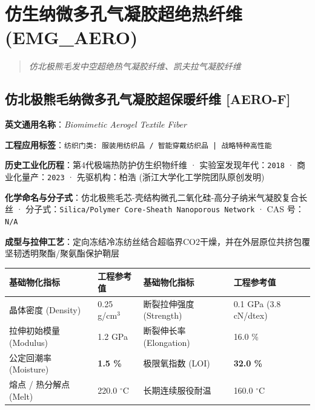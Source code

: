 \documentclass[11pt,openright,twoside,UTF8]{ctexbook}
\begin{document}
\chapter{仿生纳微多孔气凝胶超绝热纤维 (EMG\_AERO)}
\begin{quote}
\small\itshape
仿北极熊毛发中空超绝热气凝胶纤维、凯夫拉气凝胶纤维
\end{quote}

\section{仿北极熊毛纳微多孔气凝胶超保暖纤维 [AERO-F]}
\label{sec:aero-f}

\noindent\textbf{英文通用名称}：\textit{Biomimetic Aerogel Textile Fiber}\par
\noindent\textbf{工程应用标签}：\texttt{纺织门类: 服装用纺织品 / 智能穿戴纺织品 | 战略特种高性能}\par
\noindent\textbf{历史工业化历程}：第4代极端热防护仿生织物纤维 · 实验室发现年代：\texttt{2018} · 商业化量产：\texttt{2023} · 先驱机构：柏浩 (浙江大学化工学院团队原创发明)\par
\noindent\textbf{化学命名与分子式}：仿北极熊毛芯-壳结构微孔二氧化硅-高分子纳米气凝胶复合长丝 · 分子式：\texttt{Silica/Polymer Core-Sheath Nanoporous Network} · CAS 号：\texttt{N/A}\par
\noindent\textbf{成型与拉伸工艺}：定向冻结冷冻纺丝结合超临界CO2干燥，并在外层原位共挤包覆坚韧透明聚酯/聚氨酯保护鞘层\par

\vspace{0.15cm}
\begin{center}
\small
\begin{tabularx}{\textwidth}{p{3.8cm}Xp{3.8cm}X}
\toprule
\textbf{基础物化指标} & \textbf{工程参考值} & \textbf{基础物化指标} & \textbf{工程参考值} \\
\midrule
晶体密度 (Density) & 0.25 g/cm$^3$ & 断裂拉伸强度 (Strength) & 0.1 GPa (3.8 cN/dtex) \\
拉伸初始模量 (Modulus) & 1.2 GPa & 断裂伸长率 (Elongation) & 16.0 \% \\
公定回潮率 (Moisture) & \textbf{1.5 \%} & 极限氧指数 (LOI) & \textbf{32.0 \%} \\
熔点 / 热分解点 (Melt) & 220.0 $^\circ\mathrm{C}$ & 长期连续服役耐温 & 160.0 $^\circ\mathrm{C}$ \\
\bottomrule
\end{tabularx}
\end{center}
\vspace{0.15cm}
\end{document}
